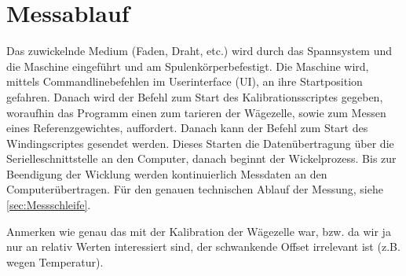 \section{Messablauf}
\label{sec:Messablauf}



Das zuwickelnde Medium (Faden, Draht, etc.) wird durch das Spannsystem und die Maschine eingeführt und am Spulenkörperbefestigt. Die Maschine wird, mittels Commandlinebefehlen im Userinterface (UI), an ihre Startposition gefahren. Danach wird der Befehl zum Start des Kalibrationsscriptes gegeben, woraufhin das Programm einen zum tarieren der Wägezelle, sowie zum Messen eines Referenzgewichtes, auffordert. Danach kann der Befehl zum Start des Windingscriptes gesendet werden. Dieses Starten die Datenübertragung über die Serielleschnittstelle an den Computer, danach beginnt der Wickelprozess. Bis zur Beendigung der Wicklung werden kontinuierlich Messdaten an den Computerübertragen. Für den genauen technischen Ablauf der Messung, siehe \autoref{sec:Messschleife}. 

Anmerken wie genau das mit der Kalibration der Wägezelle war, bzw. da wir ja nur an relativ Werten interessiert sind, der schwankende Offset irrelevant ist (z.B. wegen Temperatur).